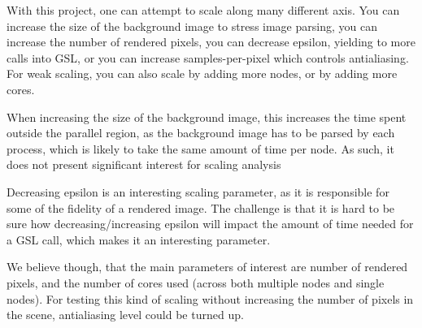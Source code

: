 With this project, one can attempt to scale along many different axis. You can increase the size of the background image to stress image parsing, you can increase the number of rendered pixels, you can decrease epsilon, yielding to more calls into GSL, or you can increase samples-per-pixel which controls antialiasing. For weak scaling, you can also scale by adding more nodes, or by adding more cores. 

When increasing the size of the background image, this increases the time spent outside the parallel region, as the background image has to be parsed by each process, which is likely to take the same amount of time per node. As such, it does not present significant interest for scaling analysis

Decreasing epsilon is an interesting scaling parameter, as it is responsible for some of the fidelity of a rendered image. The challenge is that it is hard to be sure how decreasing/increasing epsilon will impact the amount of time needed for a GSL call, which makes it an interesting parameter.

We believe though, that the main parameters of interest are number of rendered pixels, and the number of cores used (across both multiple nodes and single nodes). For testing this kind of scaling without increasing the number of pixels in the scene, antialiasing level could be turned up.


